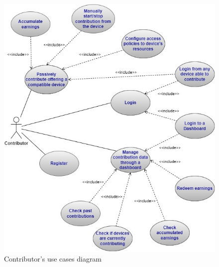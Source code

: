 \begin{figure}[!ht]
    \centering
    \includegraphics[width=\linewidth]{document/chapters/chapter_5/images/contributor_use_cases.jpg}
    \caption{Contributor's use cases diagram}
    \label{fig:use_cases_contributor}
\end{figure}

